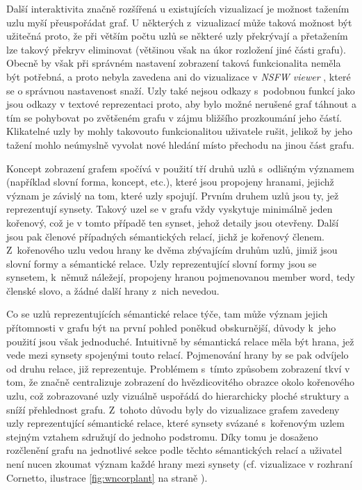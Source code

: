 \documentclass[a4paper, 11pt, oneside, showtrims]{book}
\newcommand{\simplywn}{\textit{NSFW viewer} }
\newcommand\ex{\textsf}
\begin{document}
				Další interaktivita značně rozšířená u existujících vizualizací je možnost tažením uzlu myší přeuspořádat graf. U některých z~vizualizací může taková možnost být užitečná proto, že při větším počtu uzlů se některé uzly překrývají a přetažením lze takový překryv eliminovat (většinou však na úkor rozložení jiné části grafu). Obecně by však při správném nastavení zobrazení taková funkcionalita neměla být potřebná, a proto nebyla zavedena ani do vizualizace v \simplywn, které se o správnou nastavenost snaží. Uzly také nejsou odkazy s~podobnou funkcí jako jsou odkazy v textové reprezentaci proto, aby bylo možné nerušené graf táhnout a tím se pohybovat po zvětšeném grafu v zájmu bližšího prozkoumání jeho částí. Klikatelné uzly by mohly takovouto funkcionalitou uživatele rušit, jelikož by jeho tažení mohlo neúmyslně vyvolat nové hledání místo přechodu na jinou část grafu. 

				Koncept zobrazení grafem spočívá v použití tří druhů uzlů s~odlišným významem (například slovní forma, koncept, etc.), které jsou propojeny hranami, jejichž význam je závislý na tom, které uzly spojují. Prvním druhem uzlů jsou ty, jež reprezentují synsety. Takový uzel se v grafu vždy vyskytuje minimálně jeden kořenový, což je v tomto případě ten synset, jehož detaily jsou otevřeny. Další jsou pak členové případných sémantických relací, jichž je kořenový členem. Z~kořenového uzlu vedou hrany ke dvěma zbývajícím druhům uzlů, jimiž jsou slovní formy a sémantické relace. Uzly reprezentující slovní formy jsou se synsetem, k~němuž náležejí, propojeny hranou pojmenovanou \ex{member word}, tedy členské slovo, a žádné další hrany z~nich nevedou. 

				Co se uzlů reprezentujících sémantické relace týče, tam může význam jejich přítomnosti v grafu být na první pohled poněkud obskurnější, důvody k~jeho použití jsou však jednoduché. Intuitivně by sémantická relace měla být hrana, jež vede mezi synsety spojenými touto relací. Pojmenování hrany by se pak odvíjelo od druhu relace, již reprezentuje. Problémem s~tímto způsobem zobrazení tkví v tom, že značně centralizuje zobrazení do hvězdicovitého obrazce okolo kořenového uzlu, což zobrazované uzly vizuálně uspořádá do hierarchicky ploché struktury a sníží přehlednost grafu. Z~tohoto důvodu byly do vizualizace grafem zavedeny uzly reprezentující sémantické relace, které synsety svázané s~kořenovým uzlem stejným vztahem sdružují do jednoho podstromu. Díky tomu je dosaženo rozčlenění grafu na jednotlivé sekce podle těchto sémantických relací a uživatel není nucen zkoumat význam každé hrany mezi synsety (cf. vizualizace v rozhraní Cornetto, ilustrace \ref{fig:wncorplant} na straně \pageref{fig:wncorplant}).
\end{document}
